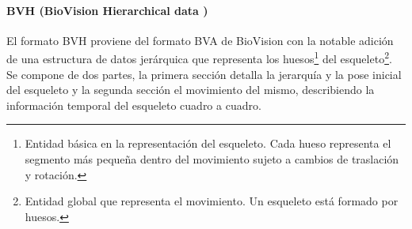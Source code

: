 \paragraph{BVH (BioVision Hierarchical data )}

El formato BVH proviene del formato BVA de BioVision con la notable adición de una estructura de datos jerárquica que representa los huesos\footnote{Entidad básica en la representación del esqueleto. Cada hueso representa el segmento más pequeña dentro del movimiento sujeto a cambios de traslación y rotación. } del esqueleto\footnote{Entidad global que representa el movimiento. Un esqueleto está formado por huesos.}. Se compone de dos partes, la primera sección detalla la jerarquía y la pose inicial del esqueleto y la segunda sección el movimiento del mismo, describiendo la información temporal del esqueleto cuadro a cuadro.
 
